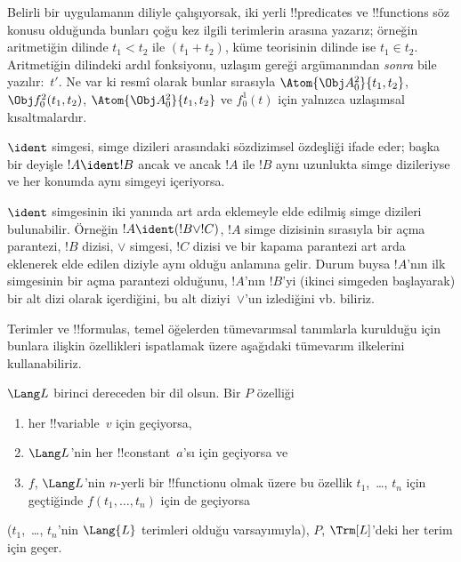 \documentclass[../../../include/open-logic-section]{subfiles}
\begin{document}
Belirli bir uygulamanın diliyle çalışıyorsak, iki yerli !!{predicate}s
ve !!{function}s söz konusu olduğunda bunları çoğu kez ilgili terimlerin arasına yazarız; örneğin
aritmetiğin dilinde $t_1 < t_2$ ile $(t_1 + t_2)$, küme teorisinin
dilinde ise $t_1 \in t_2$. Aritmetiğin dilindeki ardıl fonksiyonu,
uzlaşım gereği argümanından \emph{sonra} bile yazılır:~$t'$. Ne var ki
resmî olarak bunlar sırasıyla $\Atom{\Obj A^2_0}{t_1, t_2}$,
$\Obj f^2_0(t_1, t_2)$, $\Atom{\Obj A^2_0}{t_1, t_2}$ ve $f^1_0(t)$
için yalnızca uzlaşımsal kısaltmalardır.

\begin{defn}
$\ident$ simgesi, simge dizileri arasındaki sözdizimsel özdeşliği ifade
eder; başka bir deyişle $!A \ident !B$ ancak ve ancak $!A$ ile $!B$ aynı
uzunlukta simge dizileriyse ve her konumda aynı simgeyi içeriyorsa.
\end{defn}

$\ident$ simgesinin iki yanında art arda eklemeyle elde edilmiş simge
dizileri bulunabilir. Örneğin $!A \ident (!B \lor !C)$, $!A$ simge
dizisinin sırasıyla bir açma parantezi, $!B$ dizisi, $\lor$ simgesi,
$!C$ dizisi ve bir kapama parantezi art arda eklenerek elde edilen
diziyle aynı olduğu anlamına gelir. Durum buysa $!A$'nın ilk simgesinin
bir açma parantezi olduğunu, $!A$'nın $!B$'yi (ikinci simgeden
başlayarak) bir alt dizi olarak içerdiğini, bu alt diziyi~$\lor$'un
izlediğini vb. biliriz.

Terimler ve !!{formula}s, temel öğelerden tümevarımsal tanımlarla
kurulduğu için bunlara ilişkin özellikleri ispatlamak üzere aşağıdaki
tümevarım ilkelerini kullanabiliriz.

\begin{lem}
    $\Lang L$ birinci dereceden bir dil olsun.
    Bir $P$ özelliği
    \begin{enumerate}
        \item her !!{variable}~$v$ için geçiyorsa,
        \item $\Lang L$'nin her !!{constant}~$a$'sı için geçiyorsa ve
        \item $f$, $\Lang L$'nin $n$-yerli bir !!{function}{}u olmak
        üzere bu özellik $t_1$,~\dots, $t_n$ için geçtiğinde
        $f(t_1,\dotsc,t_n)$ için de geçiyorsa
    \end{enumerate}
    ($t_1$,~\dots, $t_n$'nin $\Lang{L}$ terimleri olduğu varsayımıyla),
    $P$, $\Trm[L]$'deki her terim için geçer.
\end{lem}
\end{document}
